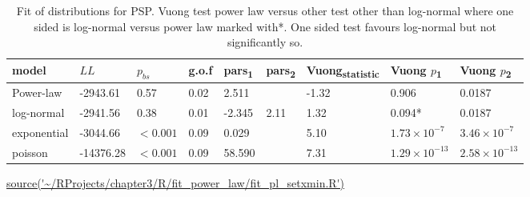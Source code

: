 \begin{table}[ht]
\centering
\setlength{\extrarowheight}{2pt}
\begin{adjustbox}{width=\textwidth}

\begin{tabular}{lllllllll}
  \toprule
model & $LL$ & $p_{bs}$ & g.o.f & pars\textsubscript{1} & pars\textsubscript{2} & Vuong\textsubscript{statistic} & Vuong $p$\textsubscript{1} & Vuong $p$\textsubscript{2} \\ 
  \midrule
Power-law & -2943.61 & 0.57 & 0.02 & 2.511 &  & -1.32 & 0.906 & 0.0187 \\ 
  log-normal & -2941.56 & 0.38 & 0.01 & -2.345 & 2.11 & 1.32 & 0.094* & 0.0187 \\ 
  exponential & -3044.66 & $<0.001$ & 0.09 & 0.029 &  & 5.10 & $1.73 \times 10^{-7}$ & $3.46 \times 10^{-7}$ \\ 
  poisson & -14376.28 & $<0.001$ & 0.09 & 58.590 &  & 7.31 & $1.29 \times 10^{-13}$ & $2.58 \times 10^{-13}$ \\ 
   \bottomrule
\end{tabular}
\end{adjustbox}
\caption{Fit of distributions for PSP. Vuong test power law versus other test other than log-normal where one sided is log-normal versus power law marked with*. One sided test favours log-normal but not significantly so.} 
\tiny\url{source('~/RProjects/chapter3/R/fit_power_law/fit_pl_setxmin.R')}
\label{tab:Fit of distributions for PSP}
\end{table}




